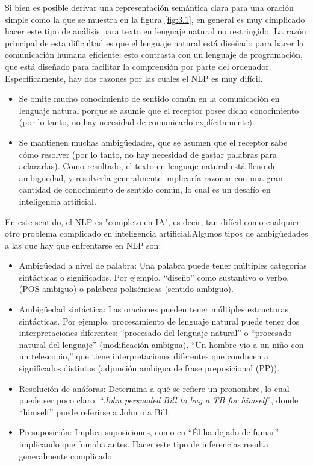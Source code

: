 Si bien es posible derivar una representación semántica clara para una oración simple como la que se muestra en la figura \ref{fig:3.1}, en general es muy cimplicado hacer este tipo de análisis para texto en lenguaje natural no restringido. La razón principal de esta dificultad es que el lenguaje natural está diseñado para hacer la comunicación humana eficiente; esto contrasta con un lenguaje de programación, que está diseñado para facilitar la comprensión por parte del ordenador. Específicamente, hay dos razones por las cuales el NLP es muy difícil. 
\begin{itemize}
    \item Se omite mucho conocimiento de sentido común en la comunicación en lenguaje natural porque se asumie que el receptor posee dicho conocimiento (por lo tanto, no hay necesidad de comunicarlo explícitamente).
    \item Se mantienen muchas ambigüedades, que se asumen que el receptor sabe cómo resolver (por lo tanto, no hay necesidad de gastar palabras para aclararlas). Como resultado, el texto en lenguaje natural está lleno de ambigüedad, y resolverla generalmente implicaría razonar con una gran cantidad de conocimiento de sentido común, lo cual es un desafío en inteligencia artificial.
\end{itemize}

En este sentido, el NLP es "completo en IA", es decir, tan difícil como cualquier otro problema complicado en inteligencia artificial.Algunos tipos de ambigüedades a las que hay que enfrentarse en NLP son:
\begin{itemize}
\item Ambigüedad a nivel de palabra: Una palabra puede tener múltiples categorías sintácticas o significados. Por ejemplo, ``diseño'' como sustantivo o verbo, (POS ambiguo) o palabras polisémicas (sentido ambiguo).
\item Ambigüedad sintáctica: Las oraciones pueden tener múltiples estructuras sintácticas. Por ejemplo, procesamiento de lenguaje natural puede tener dos interpretaciones diferentes: ``procesado del lenguaje natural'' o ``procesado natural del lenguaje'' (modificación ambigua). ``Un hombre vio a un niño con un telescopio,'' que tiene interpretaciones diferentes que conducen a significados distintos (adjunción ambigua de frase preposicional (PP)).
\item Resolución de anáforas: Determina a qué se refiere un pronombre, lo cual puede ser poco claro. ``\textit{John persuaded Bill to buy a TB for himself}'', donde ``himself'' puede referirse a John o a Bill.
\item Presuposición: Implica suposiciones, como en ``Él ha dejado de fumar'' implicando que fumaba antes. Hacer este tipo de inferencias resulta generalmente complicado. 
\end{itemize}

